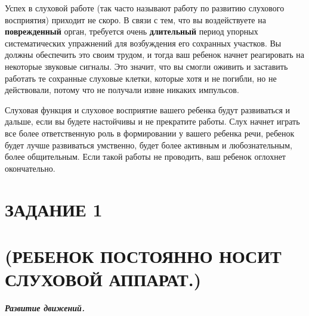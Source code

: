 \documentclass{book}
\renewcommand{\emph}[1]{\textit{#1}}
\begin{document}
Успех в слуховой работе (так часто называют работу по развитию слухового
восприятия) приходит не скоро. В связи с тем, что вы воздействуете на
\textbf{поврежденный} орган, требуется очень \textbf{длительный} период
упорных систематических упражнений для возбуждения его сохранных
участков. Вы должны обеспечить это своим трудом, и тогда ваш ребенок
начнет реагировать на некоторые звуковые сигналы. Это значит, что вы
смогли оживить и заставить работать те сохранные слуховые клетки,
которые хотя и не погибли, но не действовали, потому что не получали
извне никаких импульсов.

Слуховая функция и слуховое восприятие вашего ребенка будут развиваться
и дальше, если вы будете настойчивы и не прекратите работы. Слух начнет
играть все более ответственную роль в формировании у вашего ребенка
речи, ребенок будет лучше развиваться умственно, будет более активным и
любознательным, более общительным. Если такой работы не проводить, ваш
ребенок оглохнет окончательно.

\section{ЗАДАНИЕ 1}\section*{(РЕБЕНОК ПОСТОЯННО НОСИТ СЛУХОВОЙ АППАРАТ.)}

\emph{\textbf{Развитие движений.}}
\end{document}
